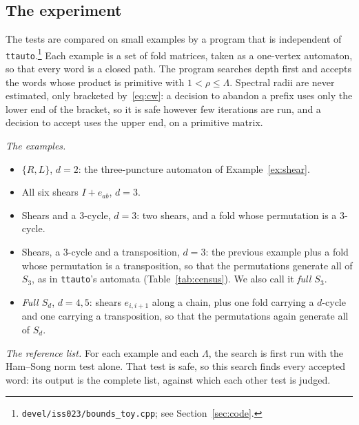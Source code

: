 \documentclass[11pt]{amsart}
\newcommand{\code}[1]{\texttt{#1}}
\newcommand{\ttauto}{\texttt{ttauto}}
\newcommand{\Lam}{\Lambda}
\theoremstyle{plain}
\theoremstyle{definition}
\begin{document}
\subsection{The experiment}

The tests are compared on small examples by a program that is independent
of \ttauto.\footnote{\code{devel/iss023/bounds\_toy.cpp}; see
Section~\ref{sec:code}.}  Each example is a set of fold matrices, taken as
a one-vertex automaton, so that every word is a closed path.  The program
searches depth first and accepts the words whose product is primitive with
$1<\rho\le\Lam$.  Spectral radii are never estimated, only bracketed
by~\eqref{eq:cw}: a decision to abandon a prefix uses only the lower end
of the bracket, so it is safe however few iterations are run, and a
decision to accept uses the upper end, on a primitive matrix.

\emph{The examples.}
\begin{itemize}
\item $\{R,L\}$, $d=2$: the three-puncture automaton of
  Example~\ref{ex:shear}.
\item All six shears $I+e_{ab}$, $d=3$.
\item Shears and a 3-cycle, $d=3$: two shears, and a fold whose
  permutation is a 3-cycle.
\item Shears, a 3-cycle and a transposition, $d=3$: the previous example
  plus a fold whose permutation is a transposition, so that the
  permutations generate all of $S_3$, as in \ttauto's automata
  (Table~\ref{tab:census}).  We also call it \emph{full $S_3$}.
\item \emph{Full $S_d$}, $d=4,5$: shears $e_{i,i+1}$ along a chain, plus
  one fold carrying a $d$-cycle and one carrying a transposition, so that
  the permutations again generate all of $S_d$.
\end{itemize}

\emph{The reference list.}  For each example and each $\Lam$, the search is
first run with the Ham--Song norm test alone.  That test is safe, so this
search finds every accepted word: its output is the complete list, against
which each other test is judged.
\end{document}
